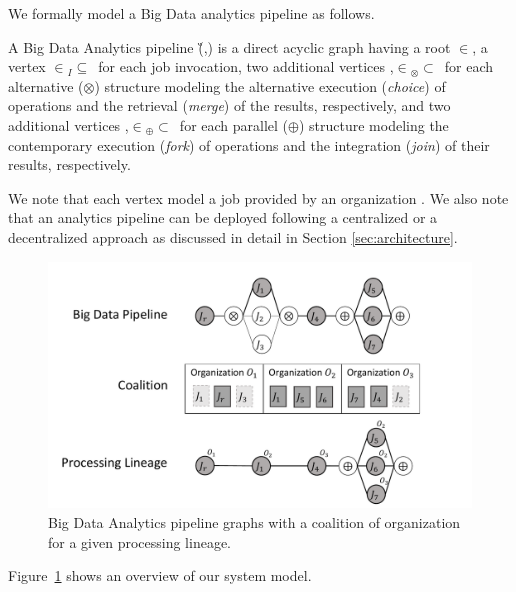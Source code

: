 We formally model a Big Data analytics pipeline as follows.

\begin{definition} \label{def:pipeline}
  A Big Data Analytics pipeline \G(\V,\E) is a direct acyclic graph having a root $\in$\V, a vertex $\in$\V$_I$$\subseteq$\V\ for each job  invocation, two additional vertices ,$\in$\V$_{\otimes}$$\subset$\V\ for each alternative ($\otimes$) structure modeling the alternative execution (\emph{choice}) of operations and the retrieval (\emph{merge}) of the results,
    respectively, and two additional vertices ,$\in$\V$_{\oplus}$$\subset$\V\ for each parallel ($\oplus$) structure modeling the contemporary execution (\emph{fork}) of operations and the integration (\emph{join}) of their results, respectively.
\end{definition}

We note that each vertex  model a job  provided by an organization .
We also note that an analytics pipeline can be deployed following a centralized or a decentralized approach as discussed in detail in Section \ref{sec:architecture}.

\begin{figure}[!t]
  \includegraphics[width=0.98\columnwidth]{generaleFig1.pdf}
  \caption{Big Data Analytics pipeline graphs with a coalition of organization for a given processing lineage.}\label{fig:BDpipeline}
\end{figure}

Figure~\ref{fig:BDpipeline} shows an overview of our system model.



